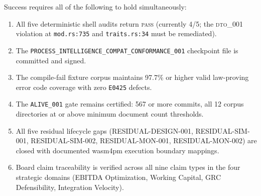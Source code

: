 Success requires all of the following to hold simultaneously:

\begin{enumerate}
  \item All five deterministic shell audits return \textsc{pass} (currently 4/5;
    the \textsc{dto\_001} violation at \texttt{mod.rs:735} and
    \texttt{traits.rs:34} must be remediated).
  \item The \texttt{PROCESS\_INTELLIGENCE\_COMPAT\_CONFORMANCE\_001} checkpoint
    file is committed and signed.
  \item The compile-fail fixture corpus maintains 97.7\% or higher valid
    law-proving error code coverage with zero \texttt{E0425} defects.
  \item The \texttt{ALIVE\_001} gate remains certified: 567 or more commits,
    all 12 corpus directories at or above minimum document count thresholds.
  \item All five residual lifecycle gaps (RESIDUAL-DESIGN-001, RESIDUAL-SIM-001,
    RESIDUAL-SIM-002, RESIDUAL-MON-001, RESIDUAL-MON-002) are closed with
    documented wasm4pm execution boundary mappings.
  \item Board claim traceability is verified across all nine claim types in the
    four strategic domains (EBITDA Optimization, Working Capital, GRC
    Defensibility, Integration Velocity).
\end{enumerate}
